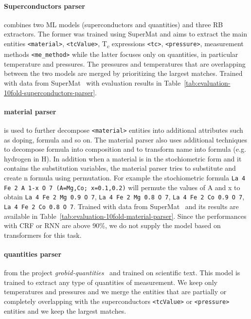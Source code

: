 \documentclass{article}
\begin{document}
\paragraph{Superconductors parser} combines two ML models (superconductors and quantities) and three RB extractors. The former was trained using SuperMat and aims to extract the main entities \texttt{<material>}, \texttt{<tcValue>}, T\textsubscript{c} expressions \texttt{<tc>}, \texttt{<pressure>}, measurement methods \texttt{<me\_method>} while the latter focuses only on quantities, in particular temperature and pressures. The pressures and temperatures that are overlapping between the two models are merged by prioritizing the largest matches. Trained with data from SuperMat~\cite{foppiano2021supermat} with evaluation results in Table~\ref{tab:evaluation-10fold-superconductors-parser}.

\paragraph{material parser} is used to further decompose \texttt{<material>} entities into additional attributes such as doping, formula and so on. The material parser also uses additional techniques to decompose formula into composition and to transform name into formula (e.g. hydrogen in H). In addition when a material is in the stochiometric form and it contains the substitution variables, the material parser tries to substitute and create n formula using permutation. For example the stochiometric formula \texttt{La 4 Fe 2 A 1-x O 7 (A=Mg,Co; x=0.1,0.2)} will permute the values of A and x to obtain \texttt{La 4 Fe 2 Mg 0.9 O 7}, \texttt{La 4 Fe 2 Mg 0.8 O 7}, \texttt{La 4 Fe 2 Co 0.9 O 7}, \texttt{La 4 Fe 2 Co 0.8 O 7}. Trained with data from SuperMat~\cite{foppiano2021supermat} and its results are available in Table~\ref{tab:evaluation-10fold-material-parser}. Since the performances with CRF or RNN are above 90\%, we do not supply the model based on transformers for this task. 

\paragraph{quantities parser} from the project \textit{grobid-quantities}~\cite{foppiano2019quantities} and trained on scientific text. This model is trained to extract any type of quantities of measurement. We keep only temperatures and pressures and we merge the entities that are partially or completely overlapping with the superconductors \texttt{<tcValue>} or \texttt{<pressure>} entities and we keep the largest matches. 
\end{document}
